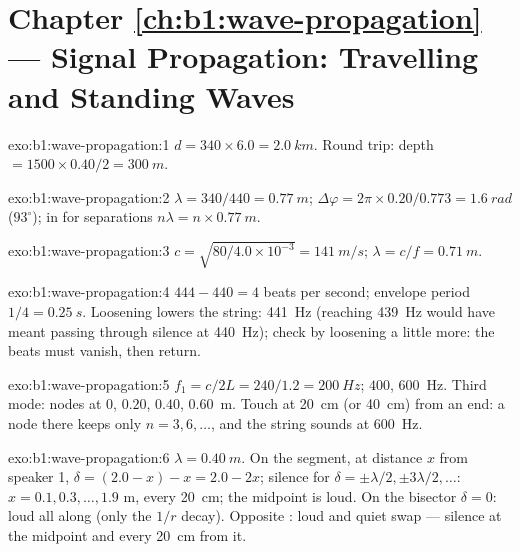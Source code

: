 \section*{Chapter \ref{ch:b1:wave-propagation} --- Signal Propagation: Travelling and Standing Waves}

\begin{solution}{exo:b1:wave-propagation:1}
$d = 340 \times 6.0 = \qty{2.0}{km}$. Round trip: depth $= 1500 \times
0.40/2 = \qty{300}{m}$.
\end{solution}

\begin{solution}{exo:b1:wave-propagation:2}
$\lambda = 340/440 = \qty{0.77}{m}$; $\Delta\varphi = 2\pi \times
0.20/0.773 = \qty{1.6}{rad}$ ($93^\circ$); in  for separations
$n\lambda = n \times \qty{0.77}{m}$.
\end{solution}

\begin{solution}{exo:b1:wave-propagation:3}
$c = \sqrt{80/4.0\times10^{-3}} = \qty{141}{m/s}$; $\lambda = c/f =
\qty{0.71}{m}$.
\end{solution}

\begin{solution}{exo:b1:wave-propagation:4}
$444 - 440 = 4$ beats per second; envelope period $1/4 = \qty{0.25}{s}$.
Loosening lowers the string: \qty{441}{Hz} (reaching \qty{439}{Hz} would
have meant passing through silence at \qty{440}{Hz}); check by loosening
a little more: the beats must vanish, then return.
\end{solution}

\begin{solution}{exo:b1:wave-propagation:5}
$f_1 = c/2L = 240/1.2 = \qty{200}{Hz}$; $400$, \qty{600}{Hz}. Third mode:
nodes at $0$, $0.20$, $0.40$, \qty{0.60}{m}. Touch at \qty{20}{cm} (or
\qty{40}{cm}) from an end: a node there keeps only $n = 3, 6, \dots$, and
the string sounds at \qty{600}{Hz}.
\end{solution}

\begin{solution}{exo:b1:wave-propagation:6}
$\lambda = \qty{0.40}{m}$. On the segment, at distance $x$ from speaker
1, $\delta = (2.0 - x) - x = 2.0 - 2x$; silence for $\delta = \pm\lambda/2,
\pm 3\lambda/2, \dots$: $x = 0.1, 0.3, \dots, 1.9$ m, every \qty{20}{cm};
the midpoint is loud. On the bisector $\delta = 0$: loud all along (only
the $1/r$ decay). Opposite : loud and quiet swap --- silence at the
midpoint and every \qty{20}{cm} from it.
\end{solution}

